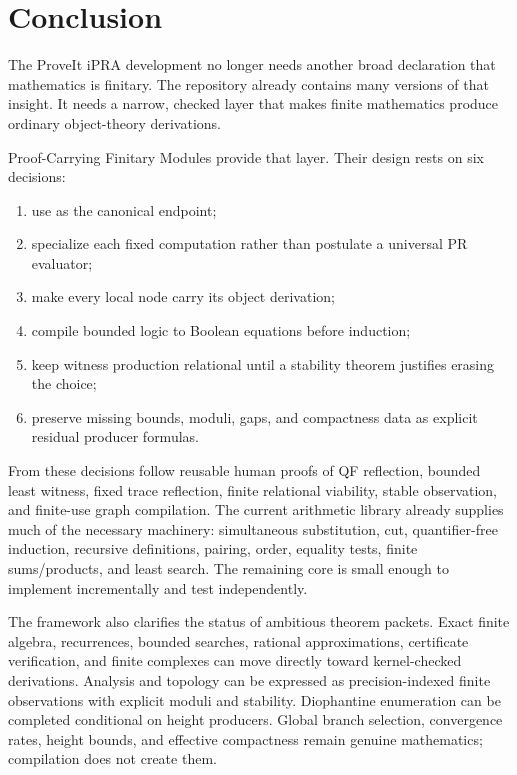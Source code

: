 
\section{Conclusion}
\label{sec:conclusion}

The ProveIt iPRA development no longer needs another broad declaration that
mathematics is finitary.  The repository already contains many versions of
that insight.  It needs a narrow, checked layer that makes finite mathematics
produce ordinary object-theory derivations.

Proof-Carrying Finitary Modules provide that layer.  Their design rests on six
decisions:

\begin{enumerate}
\item use  as the canonical endpoint;
\item specialize each fixed computation rather than postulate a universal PR
evaluator;
\item make every local node carry its object derivation;
\item compile bounded logic to Boolean equations before induction;
\item keep witness production relational until a stability theorem justifies
erasing the choice;
\item preserve missing bounds, moduli, gaps, and compactness data as explicit
residual producer formulas.
\end{enumerate}

From these decisions follow reusable human proofs of QF reflection, bounded
least witness, fixed trace reflection, finite relational viability, stable
observation, and finite-use graph compilation.  The current arithmetic library
already supplies much of the necessary machinery: simultaneous substitution,
cut, quantifier-free induction, recursive definitions, pairing, order,
equality tests, finite sums/products, and least search.  The remaining core is
small enough to implement incrementally and test independently.

The framework also clarifies the status of ambitious theorem packets.  Exact
finite algebra, recurrences, bounded searches, rational approximations,
certificate verification, and finite complexes can move directly toward
kernel-checked derivations.  Analysis and topology can be expressed as
precision-indexed finite observations with explicit moduli and stability.
Diophantine enumeration can be completed conditional on height producers.
Global branch selection, convergence rates, height bounds, and effective
compactness remain genuine mathematics; compilation does not create them.

